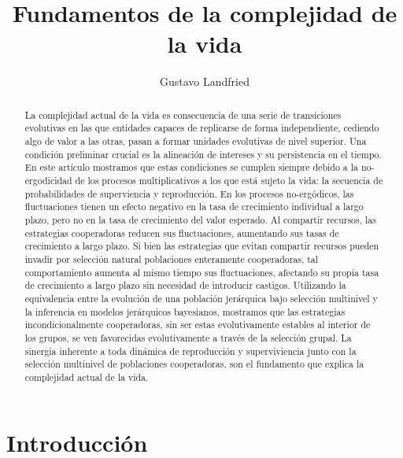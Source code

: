 \documentclass[a4paper,10pt]{article}
\title{Fundamentos de la complejidad de la vida}
\author{Gustavo Landfried}
\begin{document}
\maketitle

\begin{abstract}
La complejidad actual de la vida es consecuencia de una serie de transiciones evolutivas en las que entidades capaces de replicarse de forma independiente, cediendo algo de valor a las otras, pasan a formar unidades evolutivas de nivel superior.
Una condición preliminar crucial es la alineación de intereses y su persistencia en el tiempo.
En este artículo mostramos que estas condiciones se cumplen siempre debido a la no-ergodicidad de los procesos multiplicativos a los que está sujeto la vida: la secuencia de probabilidades de superviencia y reproducción.
En los procesos no-ergódicos, las fluctuaciones tienen un efecto negativo en la tasa de crecimiento individual a largo plazo, pero no en la tasa de crecimiento del valor esperado.
Al compartir recursos, las estrategias cooperadoras reducen sus fluctuaciones, aumentando sus tasas de crecimiento a largo plazo.
Si bien las estrategias que evitan compartir recursos pueden invadir por selección natural poblaciones enteramente cooperadoras, tal comportamiento aumenta al mismo tiempo sus fluctuaciones, afectando su propia tasa de crecimiento a largo plazo sin necesidad de introducir castigos.
Utilizando la equivalencia entre la evolución de una población jerárquica bajo selección multinivel y la inferencia en modelos jerárquicos bayesianos, mostramos que las estrategias incondicionalmente cooperadoras, sin ser estas evolutivamente estables al interior de los grupos, se ven favorecidas evolutivamente a través de la selección grupal.
La sinergia inherente a toda dinámica de reproducción y superviviencia junto con la selección multinivel de poblaciones cooperadoras, son el fundamento que explica la complejidad actual de la vida.
\end{abstract}

\section{Introducción}
\end{document}

